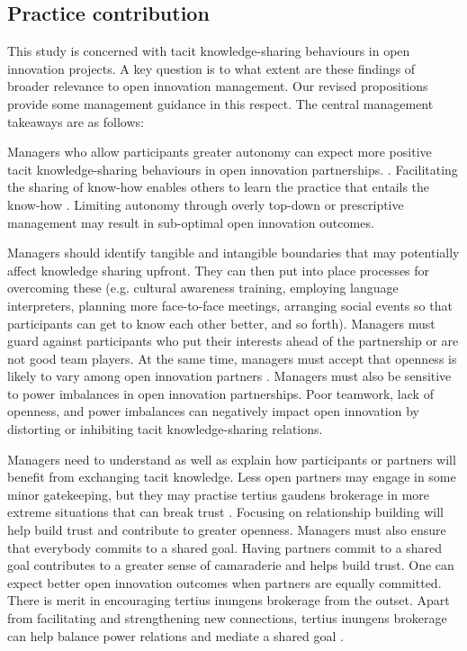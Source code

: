 \subsection{Practice contribution}

This study is concerned with tacit knowledge-sharing behaviours in open innovation projects. A key question is to what extent are these findings of broader relevance to open innovation management. Our revised propositions provide some management guidance in this respect. The central management takeaways are as follows: \medskip

Managers who allow participants greater autonomy can expect more positive tacit knowledge-sharing behaviours in open innovation partnerships. \citep{gagne2005self,gagne2009model,longo2017struggling}. Facilitating the sharing of know-how enables others to learn the practice that entails the know-how \citep{cook1999bridging}. Limiting autonomy through overly top-down or prescriptive management may result in sub-optimal open innovation outcomes. \medskip

Managers should identify tangible and intangible boundaries that may potentially affect knowledge sharing upfront. They can then put into place processes for overcoming these (e.g. cultural awareness training, employing language interpreters, planning more face-to-face meetings, arranging social events so that participants can get to know each other better, and so forth). Managers must guard against participants who put their interests ahead of the partnership or are not good team players. At the same time, managers must accept that openness is likely to vary among open innovation partners \citep{dahlander2010open}. Managers must also be sensitive to power imbalances in open innovation partnerships. Poor teamwork, lack of openness, and power imbalances can negatively impact open innovation by distorting or inhibiting tacit knowledge-sharing relations.  \medskip

Managers need to understand as well as explain how participants or partners will benefit from exchanging tacit knowledge. Less open partners may engage in some minor gatekeeping, but they may practise tertius gaudens brokerage in more extreme situations that can break trust \citep{obstfeld2014brokerage}. Focusing on relationship building will help build trust and contribute to greater openness. Managers must also ensure that everybody commits to a shared goal. Having partners commit to a shared goal contributes to a greater sense of camaraderie and helps build trust. One can expect better open innovation outcomes when partners are equally committed. There is merit in encouraging tertius inungens brokerage from the outset. Apart from facilitating and strengthening new connections, tertius inungens brokerage can help balance power relations and mediate a shared goal \citep{chesbrough2012open}.\medskip

